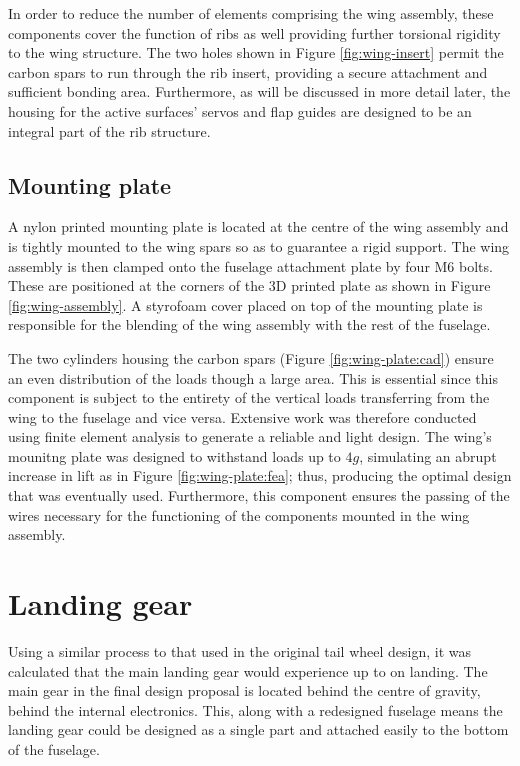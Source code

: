 \documentclass[../../main.tex]{subfiles}
\begin{document}
In order to reduce the number of elements comprising the wing assembly, these components cover the function of ribs as well providing further torsional rigidity to the wing structure.
The two holes shown in Figure \ref{fig:wing-insert} permit the carbon spars to run through the rib insert, providing a secure attachment and sufficient bonding area.
Furthermore, as will be discussed in more detail later, the housing for the active surfaces' servos and flap guides are designed to be an integral part of the rib structure. 

\subsection{Mounting plate} \label{sec:final-design-proposal:wing:mounting-plate}

A nylon printed mounting plate is located at the centre of the wing assembly and is tightly mounted to the wing spars so as to guarantee a rigid support.
The wing assembly is then clamped onto the fuselage attachment plate by four M6 bolts.
These are positioned at the corners of the 3D printed plate as shown in Figure \ref{fig:wing-assembly}.
A styrofoam cover placed on top of the mounting plate is responsible for the blending of the wing assembly with the rest of the fuselage.


The two cylinders housing the carbon spars (Figure \ref{fig:wing-plate:cad}) ensure an even distribution of the loads though a large area.
This is essential since this component is subject to the entirety of the vertical loads transferring from the wing to the fuselage and vice versa.
Extensive work was therefore conducted using finite element analysis to generate a reliable and light design.
The wing's mounitng plate was designed to withstand loads up to $4g$, simulating an abrupt increase in lift as in Figure \ref{fig:wing-plate:fea}; thus, producing the optimal design that was eventually used.
Furthermore, this component ensures the passing of the wires necessary for the functioning of the components mounted in the wing assembly.

\section{Landing gear} \label{sec:final-design-proposal:landing-gear}

Using a similar process to that used in the original tail wheel design, it was calculated that the main landing gear would experience up to  on landing.  %
The main gear in the final design proposal is located behind the centre of gravity, behind the internal electronics.
This, along with a redesigned fuselage means the landing gear could be designed as a single part and attached easily to the bottom of the fuselage. 
\end{document}
